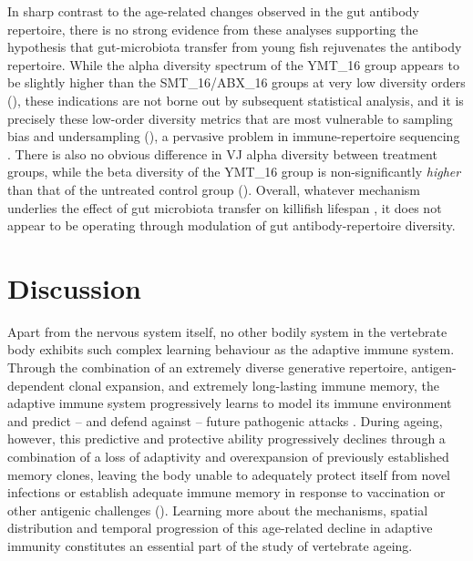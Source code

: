 In sharp contrast to the age-related changes observed in the gut antibody repertoire, there is no strong evidence from these analyses supporting the hypothesis that gut-microbiota transfer from young fish rejuvenates the antibody repertoire. While the alpha diversity spectrum of the YMT\_16 group appears to be slightly higher than the SMT\_16/ABX\_16 groups at very low diversity orders (), these indications are not borne out by subsequent statistical analysis, and it is precisely these low-order diversity metrics that are most vulnerable to sampling bias and undersampling (), a pervasive problem in immune-repertoire sequencing \parencite{mora2016diversity}. There is also no obvious difference in VJ alpha diversity between treatment groups, while the beta diversity of the YMT\_16 group is non-significantly \textit{higher} than that of the untreated control group (). Overall, whatever mechanism underlies the effect of gut microbiota transfer on killifish lifespan \parencite{smith2017microbiota}, it does not appear to be operating through modulation of gut antibody-repertoire diversity.


\FloatBarrier
\clearpage

\section{Discussion}
\label{sec:igseq_discussion}

Apart from the nervous system itself, no other bodily system in the vertebrate body exhibits such complex learning behaviour as the adaptive immune system. Through the combination of an extremely diverse generative repertoire, antigen-dependent clonal expansion, and extremely long-lasting immune memory, the adaptive immune system progressively learns to model its immune environment and predict -- and defend against -- future pathogenic attacks \parencite{mayer2018memory}. During ageing, however, this predictive and protective ability progressively declines through a combination of a loss of adaptivity and overexpansion of previously established memory clones, leaving the body unable to adequately protect itself from novel infections or establish adequate immune memory in response to vaccination or other antigenic challenges (). Learning more about the mechanisms, spatial distribution and temporal progression of this age-related decline in adaptive immunity constitutes an essential part of the study of vertebrate ageing.


